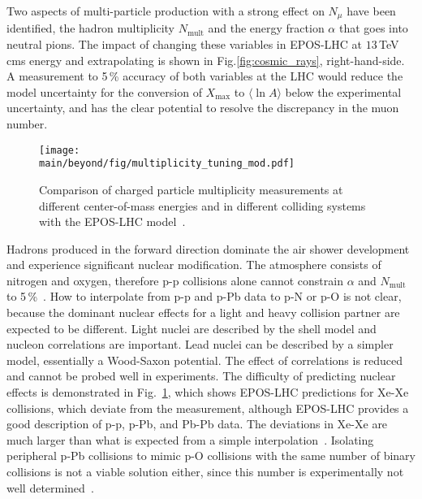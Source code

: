 \documentclass[../report.tex]{subfiles}
\providecommand{\main}{..}
\newcommand{\mlna}{\langle \ln\!A \rangle}
\newcommand{\nmu}{N_\mu}
\newcommand{\xmax}{X_\text{max}}
\newcommand{\nmult}{N_\text{mult}}
\begin{document}


Two aspects of multi-particle production with a strong effect on $\nmu$ have been identified, the hadron multiplicity $\nmult$ and the energy fraction $\alpha$ that goes into neutral pions. The impact of changing these variables in EPOS-LHC at $13$\,TeV cms energy and extrapolating is shown in Fig.\ref{fig:cosmic_rays}, right-hand-side. A measurement to 5\,\% accuracy of both variables at the LHC would reduce the model uncertainty for the conversion of $\xmax$ to $\mlna$ below the experimental uncertainty, and has the clear potential to resolve the discrepancy in the muon number.

\begin{figure}
\texttt{[image: \\main/beyond/fig/multiplicity\_tuning\_mod.pdf]}
\caption{Comparison of charged particle multiplicity measurements at different center-of-mass energies and in different colliding systems with the EPOS-LHC model~\cite{Kim:2018ink}.}
\label{fig:multiplicity_tuning}
\end{figure}

Hadrons produced in the forward direction dominate the air shower development and experience significant nuclear modification\cite{Aaij:2017cqq}. The atmosphere consists of nitrogen and oxygen, therefore p-p collisions alone cannot constrain $\alpha$ and $\nmult$ to 5\,\%~\cite{dEnterria:2018kcz}. How to interpolate from p-p and p-Pb data to p-N or p-O is not clear, because the dominant nuclear effects for a light and heavy collision partner are expected to be different. Light nuclei are described by the shell model and nucleon correlations are important. Lead nuclei can be described by a simpler model, essentially a Wood-Saxon potential. The effect of correlations is reduced and cannot be probed well in experiments.
The difficulty of predicting nuclear effects is demonstrated in Fig.~\ref{fig:multiplicity_tuning}, which shows EPOS-LHC predictions for Xe-Xe collisions, which deviate from the measurement, although EPOS-LHC provides a good description of p-p, p-Pb, and Pb-Pb data. The deviations in Xe-Xe are much larger than what is expected from a simple interpolation~\cite{Kim:2018ink}. Isolating peripheral p-Pb collisions to mimic p-O collisions with the same number of binary collisions is not a viable solution either, since this number is experimentally not well determined~\cite{Toia:2014wia}.
\end{document}
